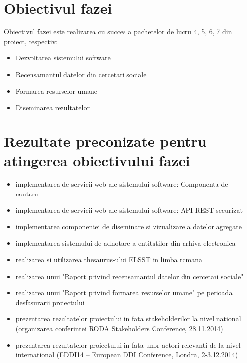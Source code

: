 \documentclass[a4paper, 10pt]{article}
\begin{document}
{\section{Obiectivul fazei}

Obiectivul fazei este realizarea cu succes a pachetelor de lucru 4, 5, 6, 7 din proiect, respectiv:
\begin{itemize}
\item
Dezvoltarea sistemului software
\item
Recensamantul datelor din cercetari sociale
\item
Formarea resurselor umane
\item
Diseminarea rezultatelor
\end{itemize}


\section{Rezultate preconizate pentru atingerea obiectivului fazei}


\begin{itemize}
\item
implementarea de servicii web ale sistemului software: Componenta de cautare  
\item
implementarea de servicii web ale sistemului software: API REST securizat
\item
implementarea componentei de diseminare si vizualizare a datelor agregate
\item
implementarea sistemului de adnotare a entitatilor din arhiva electronica
\item
realizarea si utilizarea thesaurus-ului ELSST in limba romana
\item
realizarea unui "Raport privind recensamantul datelor din cercetari sociale"
\item
realizarea unui "Raport privind formarea resurselor umane" pe perioada desfasurarii proiectului
\item
prezentarea rezultatelor proiectului in fata stakeholderilor la nivel national (organizarea conferintei RODA Stakeholders Conference, 28.11.2014) 
\item
prezentarea rezultatelor proiectului in fata unor actori relevanti de la nivel international (EDDI14 -- European DDI Conference, Londra, 2-3.12.2014)  
\end{itemize}

}
\end{document}
